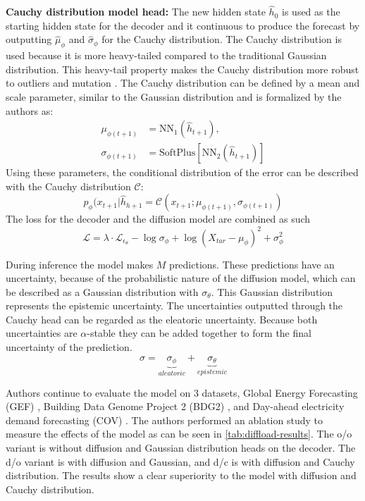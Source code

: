 \textbf{Cauchy distribution model head:}
The new hidden state $\hat{h}_0$ is used as the starting hidden state for the decoder and it continuous to produce the forecast by outputting $\hat{\mu}_\phi$ and $\hat{\sigma}_\phi$ for the Cauchy distribution. The Cauchy distribution is used because it is more heavy-tailed compared to the traditional Gaussian distribution. This heavy-tail property makes the Cauchy distribution more robust to outliers and mutation \cite{huber_robust_2011, li_learning_2023}.
The Cauchy distribution can be defined by a mean and scale parameter, similar to the Gaussian distribution and is formalized by the authors as:
\begin{align}
    \mu_{\phi(t+1)} &= \text{NN}_1(\hat{h}_{t+1}), \\
    \sigma_{\phi(t+1)} &= \text{SoftPlus} \left[ \text{NN}_2(\hat{h}_{t+1}) \right]
\end{align}
Using these parameters, the conditional distribution of the error can be described with the Cauchy distribution $\mathcal{C}$:
\begin{equation}
    p_\phi(x_{t+1} | \hat{h}_{h+1} = \mathcal{C}(x_{t+1}; \mu_{\phi(t+1)}, \sigma_{\phi(t+1)})
\end{equation}
The loss for the decoder and the diffusion model are combined as such
\begin{equation}
    \mathcal{L} = \lambda \cdot \mathcal{L}_{\epsilon_\theta} - \log{\sigma_\phi} + \log{(X_{tar} - \mu_\phi)^2 + \sigma_\phi^2}
\end{equation}

During inference the model makes $M$ predictions. These predictions have an uncertainty, because of the probabilistic nature of the diffusion model, which can be described as a Gaussian distribution with $\sigma_\theta$. This Gaussian distribution represents the epistemic uncertainty. The uncertainties outputted through the Cauchy head can be regarded as the eleatoric uncertainty. Because both uncertainties are $\alpha$-stable they can be added together to form the final uncertainty of the prediction.
\begin{equation}
    \sigma = \underbrace{\sigma_\phi}_{aleatoric} + \underbrace{\sigma_\theta}_{epistemic} 
\end{equation}

Authors continue to evaluate the model on 3 datasets, Global Energy Forecasting (GEF) \cite{hong_probabilistic_2016}, Building Data Genome Project 2 (BDG2) \cite{miller_building_2020}, and Day-ahead electricity demand forecasting (COV) \cite{farrokhabadi_day-ahead_2020}. The authors performed an ablation study to measure the effects of the model as can be seen in \autoref{tab:diffload-results}. The o/o variant is without diffusion and Gaussian distribution heads on the decoder. The d/o variant is with diffusion and Gaussian, and d/c is with diffusion and Cauchy distribution. The results show a clear superiority to the model with diffusion and Cauchy distribution.

